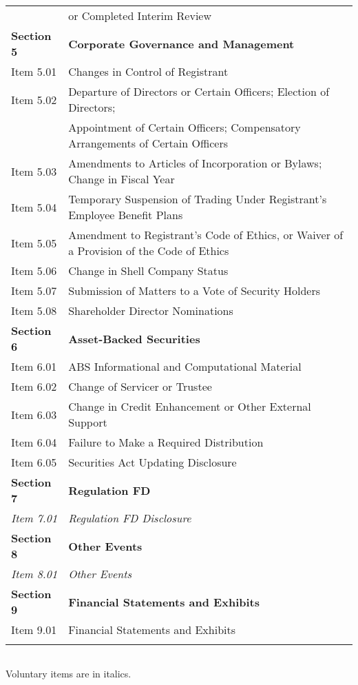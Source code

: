 \begin{table}[H]
\begin{tabular}{ll}
              & or Completed Interim Review \\
    \textbf{Section 5} & \textbf{Corporate Governance and Management} \\
    Item 5.01 & Changes in Control of Registrant \\
    Item 5.02 & Departure of Directors or Certain Officers; Election of Directors; \\
              &  Appointment of Certain Officers; Compensatory Arrangements of Certain Officers \\
    Item 5.03 & Amendments to Articles of Incorporation or Bylaws; Change in Fiscal Year \\
    Item 5.04 & Temporary Suspension of Trading Under Registrant's Employee Benefit Plans \\
    Item 5.05 & Amendment to Registrant's Code of Ethics, or Waiver of a Provision of the Code of Ethics \\
    Item 5.06 & Change in Shell Company Status \\
    Item 5.07 & Submission of Matters to a Vote of Security Holders \\
    Item 5.08 & Shareholder Director Nominations \\
    \textbf{Section 6} & \textbf{Asset-Backed Securities} \\
    Item 6.01 & ABS Informational and Computational Material \\
    Item 6.02 & Change of Servicer or Trustee \\
    Item 6.03 & Change in Credit Enhancement or Other External Support \\
    Item 6.04 & Failure to Make a Required Distribution \\
    Item 6.05 & Securities Act Updating Disclosure \\
    \textbf{Section 7} & \textbf{Regulation FD} \\
    \textit{Item 7.01} & \textit{Regulation FD Disclosure} \\
    \textbf{Section 8} & \textbf{Other Events} \\
    \textit{Item 8.01} & \textit{Other Events} \\
    \textbf{Section 9} & \textbf{Financial Statements and Exhibits} \\
    Item 9.01 & Financial Statements and Exhibits \\
              & 
    \end{tabular}%
\begin{tabular}{l}
\end{tabular}
Voluntary items are in italics.
\end{table}%
